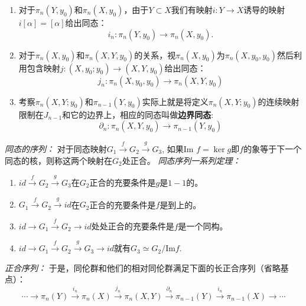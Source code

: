 \documentclass[supercite]{HustGraduPaper}
\begin{document}
\begin{appendices}
		\begin{enumerate}
			\item 对于$\pi_n(Y,y_0)$和$\pi_n(X,y_0)$，由于$Y\subset X$我们有映射$i: Y \to X$诱导的映射$i[\alpha] = [\alpha]$给出同态：
			\begin{equation}
			i_n: \pi_n(Y,y_0) \to \pi_n(X,y_0).
			\end{equation}
			\item 对于$\pi_n(X,y_0)$和$\pi_n(X,Y,y_0)$的关系，视$\pi_n(X,y_0)$为$\pi_n(X,{y_0},y_0)$然后利用包含映射$j:(X,y_0;y_0) \to (X,Y,y_0)$给出同态：
			\begin{equation}
			j_n: \pi_n(X,y_0,y_0) \to \pi_n(X,Y,y_0)
			\end{equation}
			\item 考察$\pi_n(X,Y;y_0)$和$\pi_{n-1}(Y,y_0)$实际上就是将定义$\pi_n(X,Y;y_0)$的连续映射限制在$J_{n-1}$和它的边界上，相应的同态叫做\textbf{边界同态}:
			\begin{equation}
			\partial_n: \pi_n(X,Y,y_0) \to \pi_{n-1}(Y,y_0)
			\end{equation}
		\end{enumerate}
		
		\textit{同态的序列：} 对于同态映射$G_1 \overset{f}{\rightarrow} G_2 \overset{g}{\rightarrow} G_3$, 如果$\text{Im } f = \ker g$即$f$的象等于下一个同态的核，则称这两个映射在$G_2$处正合。
		\textit{同态序列一系列定理：} \begin{enumerate}
			\item $id \overset{f}{\rightarrow} G_2 \overset{g}{\rightarrow} G_3$在$G_2$正合的充要条件是$g$是$1-1$的。
			\item $G_1 \overset{f}{\rightarrow} G_2 \overset{g}{\rightarrow} id$在$G_2$正合的充要条件是$f$是到上的。
			\item $id \to G_1 \overset{f}{\rightarrow} G_2 \to id$处处正合的充要条件是$f$是一个同构。
			\item $id \to G_1 \overset{f}{\rightarrow} G_2 \overset{g}{\rightarrow} G_3 \to id$就有$G_3 \simeq G_2 / \text{Im} f$.
		\end{enumerate}
		
		\textit{正合序列：} 于是，同伦群和他们的相对同伦群满足下面的长正合序列（省略基点）：
		\begin{equation}
		\cdots \to \pi_n(Y) \overset{i_n}{\rightarrow}{\pi_n(X)} \overset{j_n}{\rightarrow}\pi_n(X,Y) \overset{\partial_n}{\rightarrow} \pi_{n-1}(Y) \overset{i_n}{\rightarrow}\pi_{n-1}(X) \to \cdots
		\end{equation}
		

\end{appendices}
\end{document}
